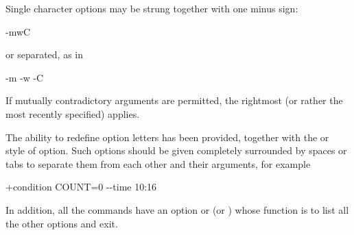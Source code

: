 Single character options may be strung together with one minus sign:

\begin{expara}

\BtrName{} -mwC

\end{expara}

or separated, as in

\begin{expara}

\BtrName{} -m -w -C

\end{expara}

If mutually contradictory arguments are permitted, the rightmost (or
rather the most recently specified) applies.

The ability to redefine option letters has been provided, together with
the  or  style of option. Such options
should be given completely surrounded by spaces or tabs to separate
them from each other and their arguments, for example

\begin{expara}

\BtrName{} +condition COUNT=0 -{}-time 10:16

\end{expara}

In addition, all the commands have an option 
or  (or ) whose function is to list all the
other options and exit.

